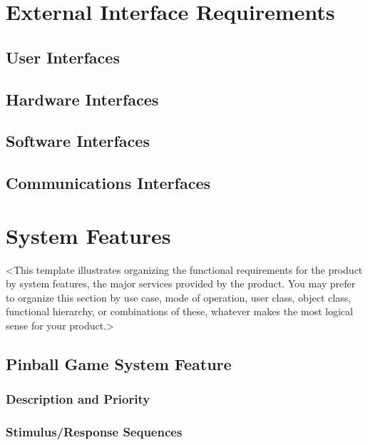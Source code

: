 \documentclass[11pt]{article}
\begin{document}
\section{External Interface Requirements}
\label{sec:org8b629b2}
\subsection{User Interfaces}
\label{sec:orgfdea334}
\subsection{Hardware Interfaces}
\label{sec:org639c6bb}
\subsection{Software Interfaces}
\label{sec:org0cabcae}
\subsection{Communications Interfaces}
\label{sec:orgf33e8f5}
\section{System Features}
\label{sec:orgce40aa4}
<This template illustrates organizing the functional requirements for the product by system
features, the major services provided by the product. You may prefer to organize this section by
use case, mode of operation, user class, object class, functional hierarchy, or combinations of
these, whatever makes the most logical sense for your product.>
\subsection{Pinball Game System Feature}
\label{sec:org49d646e}
\subsubsection{Description and Priority}
\label{sec:org46dbc81}
\subsubsection{Stimulus/Response Sequences}
\label{sec:org7e9a25a}
\end{document}
